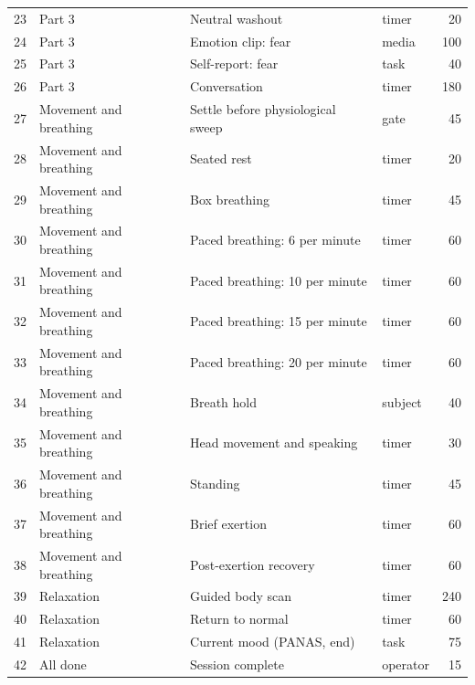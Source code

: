 \documentclass[11pt,a4paper]{article}
\begin{document}
\begin{longtable}{@{}rp{3.2cm}p{6.2cm}lr@{}}
23 & Part 3 & Neutral washout & timer & 20 \\
24 & Part 3 & Emotion clip: fear & media & 100 \\
25 & Part 3 & Self-report: fear & task & 40 \\
26 & Part 3 & Conversation & timer & 180 \\
27 & Movement and breathing & Settle before physiological sweep & gate & 45 \\
28 & Movement and breathing & Seated rest & timer & 20 \\
29 & Movement and breathing & Box breathing & timer & 45 \\
30 & Movement and breathing & Paced breathing: 6 per minute & timer & 60 \\
31 & Movement and breathing & Paced breathing: 10 per minute & timer & 60 \\
32 & Movement and breathing & Paced breathing: 15 per minute & timer & 60 \\
33 & Movement and breathing & Paced breathing: 20 per minute & timer & 60 \\
34 & Movement and breathing & Breath hold & subject & 40 \\
35 & Movement and breathing & Head movement and speaking & timer & 30 \\
36 & Movement and breathing & Standing & timer & 45 \\
37 & Movement and breathing & Brief exertion & timer & 60 \\
38 & Movement and breathing & Post-exertion recovery & timer & 60 \\
39 & Relaxation & Guided body scan & timer & 240 \\
40 & Relaxation & Return to normal & timer & 60 \\
41 & Relaxation & Current mood (PANAS, end) & task & 75 \\
42 & All done & Session complete & operator & 15 \\
\bottomrule
\end{longtable}
\end{document}
